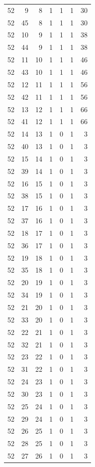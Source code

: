 \begin{longtable}{rrrrrrr}
52 & 9 & 8 & 1 & 1 & 1 & 30\\
52 & 45 & 8 & 1 & 1 & 1 & 30\\
52 & 10 & 9 & 1 & 1 & 1 & 38\\
52 & 44 & 9 & 1 & 1 & 1 & 38\\
52 & 11 & 10 & 1 & 1 & 1 & 46\\
52 & 43 & 10 & 1 & 1 & 1 & 46\\
52 & 12 & 11 & 1 & 1 & 1 & 56\\
52 & 42 & 11 & 1 & 1 & 1 & 56\\
52 & 13 & 12 & 1 & 1 & 1 & 66\\
52 & 41 & 12 & 1 & 1 & 1 & 66\\
52 & 14 & 13 & 1 & 0 & 1 & 3\\
52 & 40 & 13 & 1 & 0 & 1 & 3\\
52 & 15 & 14 & 1 & 0 & 1 & 3\\
52 & 39 & 14 & 1 & 0 & 1 & 3\\
52 & 16 & 15 & 1 & 0 & 1 & 3\\
52 & 38 & 15 & 1 & 0 & 1 & 3\\
52 & 17 & 16 & 1 & 0 & 1 & 3\\
52 & 37 & 16 & 1 & 0 & 1 & 3\\
52 & 18 & 17 & 1 & 0 & 1 & 3\\
52 & 36 & 17 & 1 & 0 & 1 & 3\\
52 & 19 & 18 & 1 & 0 & 1 & 3\\
52 & 35 & 18 & 1 & 0 & 1 & 3\\
52 & 20 & 19 & 1 & 0 & 1 & 3\\
52 & 34 & 19 & 1 & 0 & 1 & 3\\
52 & 21 & 20 & 1 & 0 & 1 & 3\\
52 & 33 & 20 & 1 & 0 & 1 & 3\\
52 & 22 & 21 & 1 & 0 & 1 & 3\\
52 & 32 & 21 & 1 & 0 & 1 & 3\\
52 & 23 & 22 & 1 & 0 & 1 & 3\\
52 & 31 & 22 & 1 & 0 & 1 & 3\\
52 & 24 & 23 & 1 & 0 & 1 & 3\\
52 & 30 & 23 & 1 & 0 & 1 & 3\\
52 & 25 & 24 & 1 & 0 & 1 & 3\\
52 & 29 & 24 & 1 & 0 & 1 & 3\\
52 & 26 & 25 & 1 & 0 & 1 & 3\\
52 & 28 & 25 & 1 & 0 & 1 & 3\\
52 & 27 & 26 & 1 & 0 & 1 & 3\\

\end{longtable}
